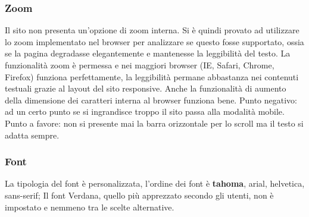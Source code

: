 \documentclass[../Relazione.tex]{subfiles}
\begin{document}
		\subsubsection{Zoom}
			Il sito non presenta un'opzione di zoom interna. Si è quindi provato ad utilizzare lo zoom implementato nel browser per analizzare se questo fosse supportato, ossia se la pagina degradasse elegantemente e mantenesse la leggibilità del testo. 
			La funzionalità zoom è permessa e nei maggiori browser (IE, Safari, Chrome, Firefox) funziona perfettamente, la leggibilità permane abbastanza nei contenuti testuali grazie al layout del sito responsive.
			Anche la funzionalità di aumento della dimensione dei caratteri interna al browser funziona bene.
			Punto negativo: ad un certo punto se si ingrandisce troppo il sito passa alla modalità mobile.
			Punto a favore: non si presente mai la barra orizzontale per lo scroll ma il testo si adatta sempre.
	
		\subsubsection{Font}
			La tipologia del font è personalizzata, l'ordine dei font è {\textbf{tahoma}, arial, helvetica, sans-serif;}
			Il font Verdana, quello più apprezzato secondo gli utenti, non è impostato e nemmeno tra le scelte alternative.
			
\end{document}
